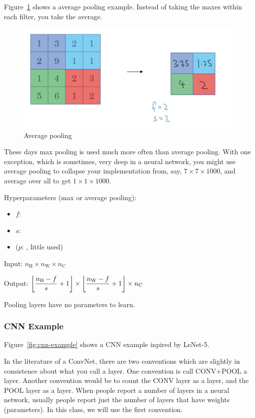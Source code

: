 \documentclass[UTF8]{article}
\DeclarePairedDelimiter\floor{\lfloor}{\rfloor}
\begin{document}
Figure~\ref{fig:average-pooling} shows a average pooling example. Instead of taking the maxes
within each filter, you take the average.

\begin{figure}[htb]
    \centering
    \includegraphics[width=40em]{figures/average-pooling}
    \caption{Average pooling}
    \label{fig:average-pooling}
\end{figure}

These days max pooling is used much more often than average pooling. With one exception, which is
sometimes, very deep in a neural network, you might use average pooling to collapse your
implementation from, say, $7 \times 7 \times 1000$, and average over all to get $1 \times 1 \times
1000$.

Hyperparameters (max or average pooling):
\begin{itemize}
    \item $f$: 
    \item $s$: 
    \item ($p$: , little used)
\end{itemize}

Input: $ n_{\text{H}} \times n_{\text{W}} \times n_{\text{C}} $

Output: $\displaystyle \floor*{\frac{n_{\text{H}}-f}{s}+1} \times
\floor*{\frac{n_{\text{W}}-f}{s}+1} \times n_{\text{C}} $

Pooling layers have no parameters to learn.

\subsubsection{CNN Example}
Figure~\ref{fig:cnn-example} shows a CNN example inpired by LeNet-5.

In the literature of a ConvNet, there are two conventions which are slightly in consistence about
what you call a layer. One convention is call CONV+POOL a layer. Another convention would be to
count the CONV layer as a layer, and the POOL layer as a layer. When people report a number of
layers in a neural network, usually people report just the number of layers that have weights
(parameters). In this class, we will use the first convention.
\end{document}
